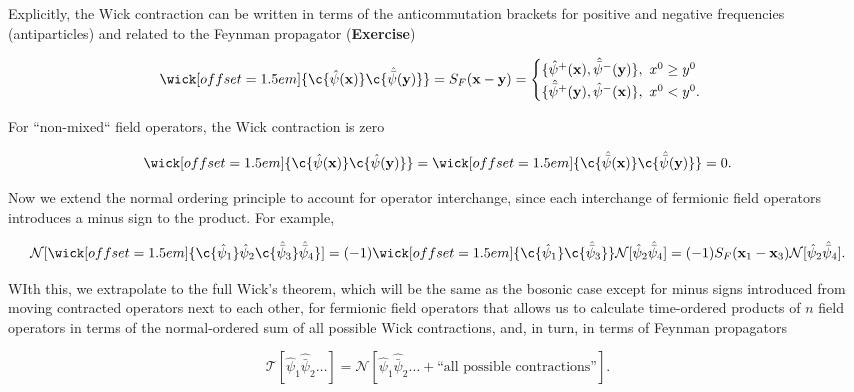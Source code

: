 \noindent Explicitly, the Wick contraction can be written in terms of the anticommutation brackets for positive and negative frequencies (antiparticles) and related to the Feynman propagator (\textbf{Exercise})

\begin{equation}
\wick[offset=1.5em]{\c {\hat{\psi} (\textbf{x})} \c {\hat{\bar{\psi}} (\textbf{y})}} = S_F (\textbf{x} - \textbf{y}) = 
	\begin{cases}
		\{ \hat{\psi}^+ (\textbf{x}), \hat{\bar{\psi}}^- (\textbf{y}) \} , \,\, x^0 \ge y^0 \\
		\{ \hat{\bar{\psi}}^+ (\textbf{y}) , \hat{\psi}^- (\textbf{x}) \}, \,\, x^0 < y^0.
	\end{cases}
\end{equation}

\noindent For ``non-mixed`` field operators, the Wick contraction is zero

\begin{equation}
\wick[offset=1.5em]{\c {\hat{\psi} (\textbf{x})} \c {\hat{\psi} (\textbf{y})}} = \wick[offset=1.5em]{\c {\hat{\bar{\psi} }(\textbf{x})} \c {\hat{\bar{\psi}} (\textbf{y})}} = 0.
\end{equation}

\noindent Now we extend the normal ordering principle to account for operator interchange, since each interchange of fermionic field operators introduces a minus sign to the product. For example,

\begin{equation}
\mathcal{N} [ \wick[offset=1.5em]{\c {\hat{\psi}_1} \hat{\psi}_2 \c {\hat{\bar{\psi}}_3} \hat{\bar{\psi}}_4 } ] = (-1) \wick[offset=1.5em]{\c {\hat{\psi}_1} \c {\hat{\bar{\psi}}_3} } \mathcal{N} [ \hat{\psi}_2 \hat{\bar{\psi}}_4 ] = (-1) S_F (\textbf{x}_1 - \textbf{x}_3) \mathcal{N} [ \hat{\psi}_2 \hat{\bar{\psi}}_4 ].
\end{equation}

\noindent WIth this, we extrapolate to the full Wick's theorem, which will be the same as the bosonic case except for minus signs introduced from moving contracted operators next to each other, for fermionic field operators that allows us to calculate time-ordered products of $n$ field operators in terms of the normal-ordered sum of all possible Wick contractions, and, in turn, in terms of Feynman propagators

\begin{equation}
\mathcal{T} [ \hat{\psi}_1 \hat{\bar{\psi}}_2 \dots ] = \mathcal{N} [ \hat{\psi}_1 \hat{\bar{\psi}}_2 \dots + \text{``all possible contractions''} ].
\end{equation}

